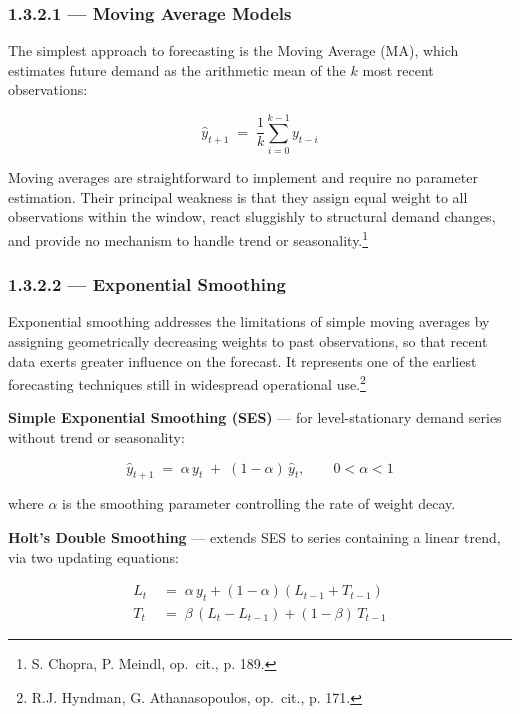 \subsubsection{1.3.2.1 — Moving Average Models}

The simplest approach to forecasting is the Moving Average (MA), which
estimates future demand as the arithmetic mean of the $k$ most recent
observations:

\begin{equation}
  \hat{y}_{t+1} \;=\; \frac{1}{k}\sum_{i=0}^{k-1} y_{t-i}
  \label{eq:ma}
\end{equation}

Moving averages are straightforward to implement and require no parameter
estimation. Their principal weakness is that they assign equal weight to
all observations within the window, react sluggishly to structural demand
changes, and provide no mechanism to handle trend or seasonality.\footnote{S.
Chopra, P. Meindl, op.\ cit., p. 189.}

\subsubsection{1.3.2.2 — Exponential Smoothing}

Exponential smoothing addresses the limitations of simple moving averages by
assigning geometrically decreasing weights to past observations, so that
recent data exerts greater influence on the forecast. It represents
one of the earliest forecasting techniques still in widespread operational
use.\footnote{R.J. Hyndman, G. Athanasopoulos, op.\ cit., p. 171.}

\medskip
\noindent\textbf{Simple Exponential Smoothing (SES)} — for level-stationary
demand series without trend or seasonality:

\begin{equation}
  \hat{y}_{t+1} \;=\; \alpha\,y_t \;+\; (1-\alpha)\,\hat{y}_t,
  \qquad 0 < \alpha < 1
  \label{eq:ses}
\end{equation}

\noindent where $\alpha$ is the smoothing parameter controlling the rate of
weight decay.

\medskip
\noindent\textbf{Holt's Double Smoothing} — extends SES to series
containing a linear trend, via two updating equations:

\begin{align}
  L_t &\;=\; \alpha\,y_t + (1-\alpha)(L_{t-1} + T_{t-1})
  \label{eq:holt_level}\\
  T_t &\;=\; \beta\,(L_t - L_{t-1}) + (1-\beta)\,T_{t-1}
  \label{eq:holt_trend}
\end{align}

